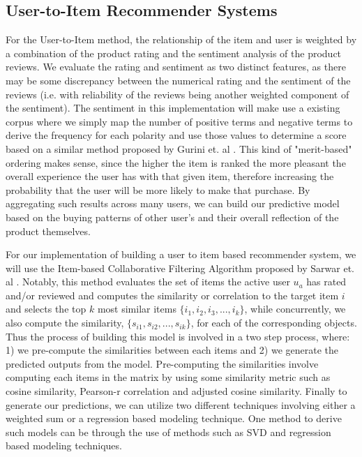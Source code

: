 \documentclass[a4paper, 11pt]{article}
\begin{document}
\subsection{User-to-Item Recommender Systems}
For the User-to-Item method, the relationship of the item and user is weighted by a combination of the product rating and the sentiment analysis of the product reviews. We evaluate the rating and sentiment as two distinct features, as there may be some discrepancy between the numerical rating and the sentiment of the reviews (i.e. with reliability of the reviews being another weighted component of the sentiment). The sentiment in this implementation will make use a existing corpus where we simply map the number of positive terms and negative terms to derive the frequency for each polarity and use those values to determine a score based on a similar method proposed by Gurini et. al \cite{Gurini}. This kind of "merit-based" ordering makes sense, since the higher the item is ranked the more pleasant the overall  experience the user has with that given item, therefore increasing the probability that the user will be more likely to make that purchase. By aggregating such results across many users, we can build our predictive model based on the buying patterns of other user's and their overall reflection of the product themselves.

For our implementation of building a user to item based recommender system, we will use the Item-based Collaborative Filtering Algorithm proposed by Sarwar et. al \cite{Sarwar01}. Notably, this method evaluates the set of items the active user $u_a$ has rated and/or reviewed and computes the similarity or correlation to the target item $i$ and selects the top $k$ most similar items $\{i_1, i_2, i_3, ..., i_k\}$, while concurrently, we also compute the similarity, $\{s_{i1}, s_{i2}, ..., s_{ik}\}$, for each of the corresponding objects. Thus the process of building this model is involved in a two step process, where: 1) we pre-compute the similarities between each items and 2) we generate the predicted outputs from the model. Pre-computing the similarities involve computing each items in the matrix by using some similarity metric such as cosine similarity, Pearson-r correlation and adjusted cosine similarity. Finally to generate our predictions, we can utilize two different techniques involving either a weighted sum or a regression based modeling technique. One method to derive such models can be through the use of methods such as SVD and regression based modeling techniques.
\end{document}
